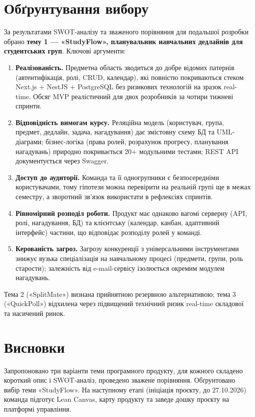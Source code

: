 \documentclass[12pt]{article}
\begin{document}
\section{Обґрунтування вибору}
За результатами SWOT-аналізу та зваженого порівняння для подальшої розробки обрано \textbf{тему 1 --- «StudyFlow», планувальник навчальних дедлайнів для студентських груп}. Ключові аргументи:

\begin{enumerate}[leftmargin=1.5em]
  \item \textbf{Реалізованість.} Предметна область зводиться до добре відомих патернів (автентифікація, ролі, CRUD, календар), які повністю покриваються стеком Next.js + NestJS + PostgreSQL без ризикових технологій на зразок real-time. Обсяг MVP реалістичний для двох розробників за чотири тижневі спринти.
  \item \textbf{Відповідність вимогам курсу.} Реляційна модель (користувач, група, предмет, дедлайн, задача, нагадування) дає змістовну схему БД та UML-діаграми; бізнес-логіка (права ролей, розрахунок прогресу, планування нагадувань) природно покривається 20+ модульними тестами; REST API документується через Swagger.
  \item \textbf{Доступ до аудиторії.} Команда та її одногрупники є безпосередніми користувачами, тому гіпотези можна перевірити на реальній групі ще в межах семестру, а зворотний зв'язок використати в рефлексіях спринтів.
  \item \textbf{Рівномірний розподіл роботи.} Продукт має однаково вагомі серверну (API, ролі, нагадування, БД) та клієнтську (календар, канбан, адаптивний інтерфейс) частини, що відповідає розподілу ролей у команді.
  \item \textbf{Керованість загроз.} Загрозу конкуренції з універсальними інструментами знижує вузька спеціалізація на навчальному процесі (предмети, групи, роль старости); залежність від e-mail-сервісу ізолюється окремим модулем нагадувань.
\end{enumerate}

Тема 2 («SplitMate») визнана прийнятною резервною альтернативою; тема 3 («QuickPoll») відхилена через підвищений технічний ризик real-time складової та насичений ринок.

\section{Висновки}
Запропоновано три варіанти теми програмного продукту, для кожного складено короткий опис і SWOT-аналіз, проведено зважене порівняння. Обґрунтовано вибір теми «StudyFlow». На наступному етапі (ініціація проєкту, до 27.10.2026) команда підготує Lean Canvas, карту продукту та заведе дошку проєкту на платформі управління.
\end{document}
